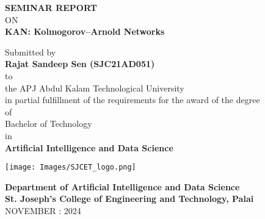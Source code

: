 \thispagestyle{empty}
\begin{center}
 
{\normalsize \bf SEMINAR REPORT}\\
ON\\
\vspace*{0.2 cm}
{\huge \bf KAN: Kolmogorov–Arnold Networks}\\ 
\vspace{2mm}

   \vspace{0.5 cm}
   \large Submitted by\\
   { \bf Rajat Sandeep Sen (SJC21AD051)}\\[-0.6mm]
  {\large to\\[-0.6mm] the APJ Abdul Kalam Technological University\\[-0.6mm] in partial fulfillment of the requirements for the award of the degree\\[-0.6mm] of\\[-0.6mm] Bachelor of Technology\\[-0.6mm] in\\[-0.6mm] {\bf Artificial Intelligence and Data Science}}
  
   \begin{center}
   \texttt{[image: Images/SJCET\_logo.png]}
   \end{center}
   \vspace*{-0.5cm}
  {\LARGE {\bf Department of Artificial Intelligence and Data Science}}\\
          [-3mm] {\large {\bf St. Joseph's College of Engineering and Technology, Palai}\\
           [1mm] NOVEMBER : 2024}

\end{center}
\newpage
\thispagestyle{empty}

